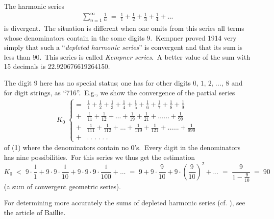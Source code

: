 \documentclass[12pt]{article}
\theoremstyle{definition}
\begin{document}

The harmonic series
\begin{align}
\sum_{n=1}^\infty\frac{1}{n} \;=\; \frac{1}{1}+\frac{1}{2}+\frac{1}{3}+\frac{1}{4}+\ldots
\end{align}
is divergent.\, The situation is different when one omits from this series all terms whose denominators contain in the  some digits 9.\, Kempner proved 1914 very simply that such a ``\emph{depleted harmonic series}'' is convergent and that its sum is less than 90.\, This series is called \emph{Kempner series}.\, A better value of the sum with 15 decimals is 22.920676619264150.

The digit 9 here has no special status; one has  for other digits 
$0,\,1,\,2,\,\ldots,\,8$ and  for digit strings, as ``716''.\, E.g., we show the convergence of the partial series
\begin{align*}
K_0\;
\begin{cases}
=&\!\!\frac{1}{1}+\frac{1}{2}+\frac{1}{3}+\frac{1}{4}+\frac{1}{5}+\frac{1}{6}+\frac{1}{7}+\frac{1}{8}+\frac{1}{9}\\
+&\!\!\frac{1}{11}+\frac{1}{12}+\ldots+\frac{1}{19}+\frac{1}{21}+\ldots\ldots+\frac{1}{99}\\
+&\!\!\frac{1}{111}+\frac{1}{112}+\ldots+\frac{1}{119}+\frac{1}{121}+\ldots\ldots+\frac{1}{999}\\
+&.\;.\;.\;.\;.\;.
\end{cases}
\end{align*}
of (1) where the denominators contain no 0's.\, Every digit in the denominators has nine possibilities.\, For this series we thus get the estimation
$$K_0 \;<\; 9\!\cdot\!\frac{1}{1}+9\!\cdot\!9\cdot\!\frac{1}{10}+9\!\cdot\!9\!\cdot\!9\!\cdot\frac{1}{100}+\ldots 
\;=\; 9+9\!\cdot\!\frac{9}{10}+9\!\cdot\!\left(\frac{9}{10}\right)^{\!2}+\ldots
\;=\; \frac{9}{1\!-\!\frac{9}{10}} \;=\; 90$$
(a sum of convergent geometric series).

For determining more accurately the sums of depleted harmonic series (cf. ), see the article  of Baillie.

\end{document}
